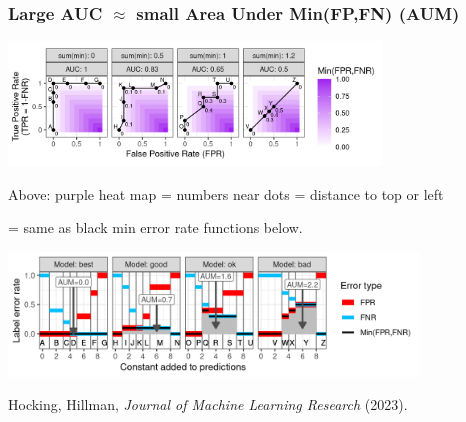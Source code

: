 \documentclass[t]{beamer}
\begin{document}
\begin{frame}
  \frametitle{Large AUC $\approx$ small Area Under Min(FP,FN) (AUM)}
  \small
  
  \includegraphics[height=1.3in]{figure-more-than-one-new-binary-heat}

  Above: purple heat map = numbers near dots = distance to top or left

  = same as black min error rate functions below.

  \includegraphics[height=1.3in]{figure-more-than-one-new-binary-aum-rate}

  Hocking, Hillman, \emph{Journal of Machine Learning Research} (2023).

  
\end{frame}
\end{document}
